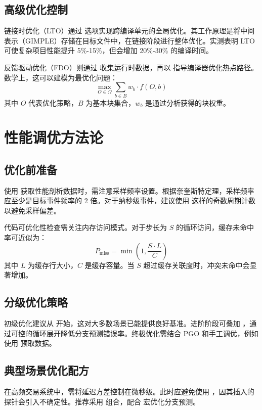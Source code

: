 \section{高级优化控制}
链接时优化（LTO）通过  选项实现跨编译单元的全局优化。其工作原理是将中间表示（GIMPLE）存储在目标文件中，在链接阶段进行整体优化。实测表明 LTO 可使复杂项目性能提升 5\%{}-15\%{}，但会增加 20\%{}-30\%{} 的编译时间。\par
反馈驱动优化（FDO）则通过  收集运行时数据，再以  指导编译器优化热点路径。数学上，这可以建模为最优化问题：
$$ \max_{O \in \Omega} \sum_{b \in B} w_b \cdot f(O,b) $$
其中 $O$ 代表优化策略，$B$ 为基本块集合，$w_b$ 是通过分析获得的块权重。\par
\chapter{性能调优方法论}
\section{优化前准备}
使用  获取性能剖析数据时，需注意采样频率设置。根据奈奎斯特定理，采样频率应至少是目标事件频率的 2 倍。对于纳秒级事件，建议使用  这样的奇数周期计数以避免采样偏差。\par
代码可优化性检查需关注内存访问模式。对于步长为 $S$ 的循环访问，缓存未命中率可近似为：
$$ P_{\text{miss}} = \min\left(1, \frac{S \cdot L}{C}\right) $$
其中 $L$ 为缓存行大小，$C$ 是缓存容量。当 $S$ 超过缓存关联度时，冲突未命中会显著增加。\par
\section{分级优化策略}
初级优化建议从  开始，这对大多数场景已能提供良好基准。进阶阶段可叠加 ，通过可控的循环展开降低分支预测错误率。终极优化需结合 PGO 和手工调优，例如使用  预取数据。\par
\section{典型场景优化配方}
在高频交易系统中，需将延迟方差控制在微秒级。此时应避免使用 ，因其插入的探针会引入不确定性。推荐采用  组合，配合  宏优化分支预测。\par
